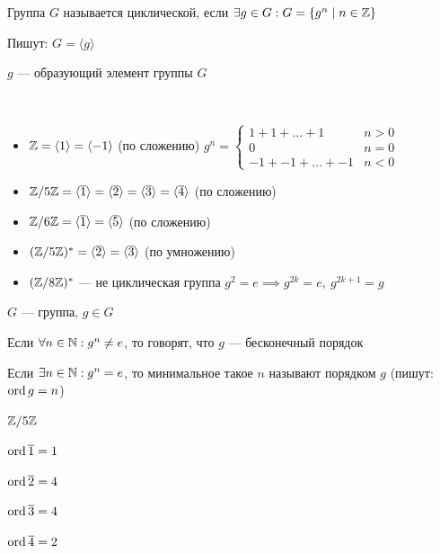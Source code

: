 \begin{defn}
    Группа $G$ называется циклической, если $\exists g \in G : G = \{g^n \mid n \in \mathbb{Z}\}$

    Пишут: $G = \langle g \rangle$
\end{defn}

\begin{defn}
    $g$ --- образующий элемент группы $G$
\end{defn}

\begin{examples}~
    
    \begin{itemize}
        \item $\mathbb{Z} = \langle 1 \rangle = \langle -1 \rangle$ (по сложению) $g^n = \begin{cases}
            1 + 1 + \ldots + 1 & n > 0 \\
            0 & n = 0 \\
            -1 + -1 + \ldots + -1 & n < 0
        \end{cases}$

        \item $\mathbb{Z}/5\mathbb{Z} = \langle \overline{1} \rangle = \langle \overline{2} \rangle = \langle \overline{3} \rangle = \langle \overline{4} \rangle$ (по сложению)
        
        \item $\mathbb{Z}/6\mathbb{Z} = \langle \overline{1} \rangle = \langle \overline{5} \rangle$ (по сложению)
        
        \item $(\mathbb{Z}/5\mathbb{Z})^* = \langle \overline{2} \rangle = \langle \overline{3} \rangle$ (по умножению)
        
        \item $(\mathbb{Z}/8\mathbb{Z})^*$ --- не циклическая группа $g^2 = e \implies g^{2k} = e,~g^{2k+1} = g$
    \end{itemize}
\end{examples}

\begin{defn}
    $G$ --- группа, $g \in G$

    Если $\forall n \in \mathbb{N}: g^n \neq e$, то говорят, что $g$ --- бесконечный порядок

    Если $\exists n \in \mathbb{N}: g^n = e$, то минимальное такое $n$ называют порядком $g$ (пишут: $\operatorname{ord} g = n$)
\end{defn}

\begin{example}
    $\mathbb{Z}/5\mathbb{Z}$

    $\operatorname{ord} \overline{1} = 1$

    $\operatorname{ord} \overline{2} = 4$
    
    $\operatorname{ord} \overline{3} = 4$
    
    $\operatorname{ord} \overline{4} = 2$
\end{example}

